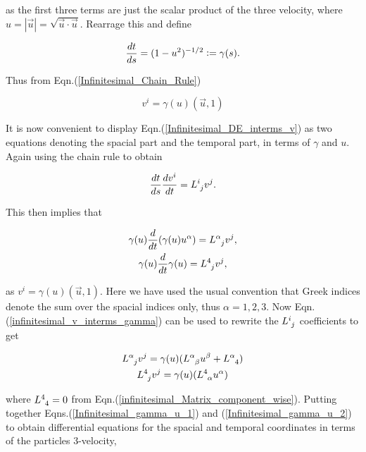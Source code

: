 \noindent as the first three terms are just the scalar product of the three velocity, where $u = |\vec{u}| = \sqrt{\vec{u} \cdot \vec{u}}$. Rearrage this and define

\begin{equation*}
\frac{dt}{ds} = (1-u^2)^{-1/2} \vcentcolon = \gamma (s).
\end{equation*}

\noindent Thus from Eqn.(\ref{Infinitesimal_Chain_Rule})

\begin{equation}\label{infinitesimal_v_interms_gamma}
v^i = \gamma(u) (\vec{u}, 1)
\end{equation}

\noindent It is now convenient to display Eqn.(\ref{Infinitesimal_DE_interms_v}) as two equations denoting the spacial part and the temporal part, in terms of $\gamma$ and $u$. Again using the chain rule to obtain

\begin{equation*} 
\frac{dt}{ds} \frac{dv^i}{dt} = \tensor{L}{^{i}_{j}}v^j. 
\end{equation*} 

\noindent This then implies that 

\begin{gather}\label{Infinitesimal_gamma_u_1}
\gamma(u) \frac{d}{dt} (\gamma(u) u^{\alpha}) = \tensor{L}{^{\alpha}_{j}} v^j, \\\nonumber
\gamma(u) \frac{d}{dt} \gamma(u) = \tensor{L}{^{4}_{j}} v^j,
\end{gather}

\noindent as $v^i = \gamma(u)(\vec{u},1)$. Here we have used the usual convention that Greek indices denote the sum over the spacial indices only, thus $\alpha = 1,2,3$. Now Eqn.(\ref{infinitesimal_v_interms_gamma}) can be used to rewrite the $\tensor{L}{^{i}_{j}}$ coefficients to get

\begin{gather}\label{Infinitesimal_gamma_u_2}
\tensor{L}{^{\alpha}_{j}} v^j = \gamma(u) (\tensor{L}{^{\alpha}_{\beta}} u^{\beta} + \tensor{L}{^{\alpha}_4}) \\ \nonumber
\tensor{L}{^{4}_{j}} v^j = \gamma(u) (\tensor{L}{^{4}_{\alpha}} u^{\alpha})
\end{gather} 

\noindent where $\tensor{L}{^{4}_{4}} = 0$ from Eqn.(\ref{infinitesimal_Matrix_component_wise}). Putting together Eqns.(\ref{Infinitesimal_gamma_u_1}) and (\ref{Infinitesimal_gamma_u_2}) to obtain differential equations for the spacial and temporal coordinates in terms of the particles $3$-velocity,

